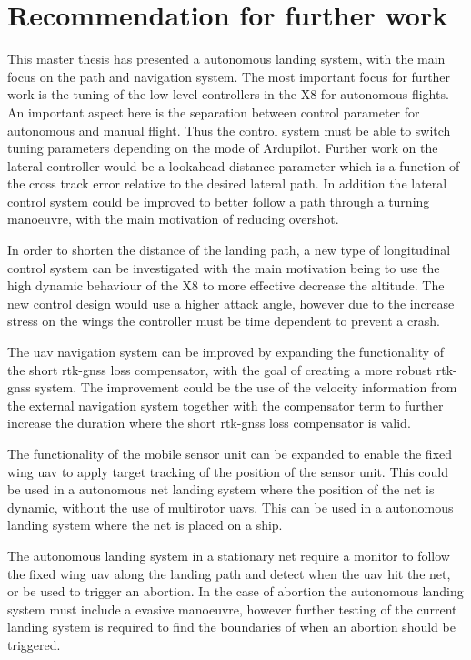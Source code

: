\section{Recommendation for further work}
This master thesis has presented a autonomous landing system, with the main focus on the path and navigation system.
The most important focus for further work is the tuning of the low level controllers in the X8 for autonomous flights. An important aspect here is the separation between control parameter for autonomous and manual flight. Thus the control system must be able to switch tuning parameters depending on the mode of Ardupilot. Further work on the lateral controller would be a lookahead distance parameter which is a function of the cross track error relative to the desired lateral path. In addition the lateral control system could be improved to better follow a path through a turning manoeuvre, with the main motivation of reducing overshot.

In order to shorten the distance of the landing path, a new type of longitudinal control system can be investigated with the main motivation being to use the high dynamic behaviour of the X8 to more effective decrease the altitude. The new control design would use a higher attack angle, however due to the increase stress on the wings the controller must be time dependent to prevent a crash.

The \gls{uav} navigation system can be improved by expanding the functionality of the short \gls{rtk-gnss} loss compensator, with the goal of creating a more robust \gls{rtk-gnss} system. The improvement could be the use of the velocity information from the external navigation system together with the compensator term to further increase the duration where the short \gls{rtk-gnss} loss compensator is valid.

The functionality of the mobile sensor unit can be expanded to enable the fixed wing \gls{uav} to apply target tracking of the position of the sensor unit. This could be used in a autonomous net landing system where the position of the net is dynamic, without the use of multirotor \glspl{uav}. This can be used in a autonomous landing system where the net is placed on a ship.

The autonomous landing system in a stationary net require a monitor to follow the fixed wing \gls{uav} along the landing path and detect when the \gls{uav} hit the net, or be used to trigger an abortion. In the case of abortion the autonomous landing system must include a evasive manoeuvre, however further testing of the current landing system is required to find the boundaries of when an abortion should be triggered.